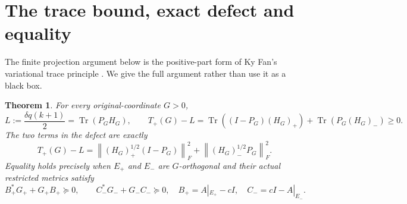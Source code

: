 \documentclass[11pt]{article}
\newcommand{\norm}[1]{\left\lVert#1\right\rVert}
\DeclareMathOperator{\Tr}{Tr}
\newtheorem{theorem}{Theorem}
\begin{document}
\section{The trace bound, exact defect and equality}

The finite projection argument below is the positive-part form of
Ky Fan's variational trace principle \cite{fan}. We give the full
argument rather than use it as a black box.

\begin{theorem}
For every original-coordinate \(G>0\),
\begin{equation}\tag{PT7}
 L:=\frac{\delta q(k+1)}2=\Tr(P_GH_G),\qquad
 T_+(G)-L
 =\Tr((I-P_G)(H_G)_+)+\Tr(P_G(H_G)_-)\ge0.
\end{equation}
The two terms in the defect are exactly
\begin{equation}\tag{PT8}
 T_+(G)-L
 =\norm{(H_G)_+^{1/2}(I-P_G)}_F^2
   +\norm{(H_G)_-^{1/2}P_G}_F^2.
\end{equation}
Equality holds precisely when \(E_+\) and \(E_-\) are
\(G\)-orthogonal and their actual restricted metrics satisfy
\begin{equation}\tag{PT9}
 B_+^*G_++G_+B_+\succeq0,\qquad
 C_-^*G_-+G_-C_-\succeq0,
 \quad B_+=A|_{E_+}-cI,\quad C_-=cI-A|_{E_-}.
\end{equation}
\end{theorem}
\end{document}

